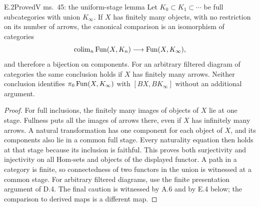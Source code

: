 \begin{claim}{E.2}{Proved}{V ms.~45: the uniform-stage lemma}
Let $K_0\subset K_1\subset\cdots$ be full subcategories with union $K_\infty$. If $X$ has finitely many objects, with no restriction on its number of arrows, the canonical comparison is an isomorphism of categories
\[
 \operatorname{colim}_n\operatorname{Fun}(X,K_n)\longrightarrow\operatorname{Fun}(X,K_\infty),
\]
and therefore a bijection on components. For an arbitrary filtered diagram of categories the same conclusion holds if $X$ has finitely many arrows. Neither conclusion identifies $\pi_0\operatorname{Fun}(X,K_\infty)$ with $[BX,BK_\infty]$ without an additional argument.
\end{claim}
\begin{proof}
For full inclusions, the finitely many images of objects of $X$ lie at one stage. Fullness puts all the images of arrows there, even if $X$ has infinitely many arrows. A natural transformation has one component for each object of $X$, and its components also lie in a common full stage. Every naturality equation then holds at that stage because its inclusion is faithful. This proves both surjectivity and injectivity on all Hom-sets and objects of the displayed functor. A path in a category is finite, so connectedness of two functors in the union is witnessed at a common stage. For arbitrary filtered diagrams, use the finite presentation argument of D.4. The final caution is witnessed by A.6 and by E.4 below; the comparison to derived maps is a different map.
\end{proof}

